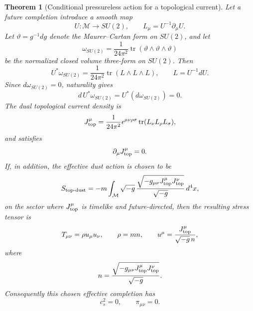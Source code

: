 \documentclass[11pt,a4paper]{article}
\def\dd{d}%
\numberwithin{equation}{section}
\newtheorem{theorem}[criterion]{Theorem}
\theoremstyle{remark}
\newcommand{\M}{\mathcal{M}}
\newcommand{\dd}{\mathrm{d}}
\begin{document}
\begin{theorem}[Conditional pressureless action for a topological current]
Let a future completion introduce a smooth map
\begin{equation}
U:\M\longrightarrow SU(2),
\qquad
L_\mu=U^{-1}\partial_\mu U.
\end{equation}
Let \(\vartheta=g^{-1}\dd g\) denote the Maurer--Cartan form on \(SU(2)\), and let
\begin{equation}
\omega_{SU(2)}
=
\frac{1}{24\pi^2}
\operatorname{tr}(\vartheta\wedge\vartheta\wedge\vartheta)
\end{equation}
be the normalized closed volume three-form on \(SU(2)\). Then
\begin{equation}
U^*\omega_{SU(2)}
=
\frac{1}{24\pi^2}
\operatorname{tr}(L\wedge L\wedge L),
\qquad
L=U^{-1}\dd U.
\end{equation}
Since \(\dd\omega_{SU(2)}=0\), naturality gives
\begin{equation}
\dd\,U^*\omega_{SU(2)}=U^*(\dd\omega_{SU(2)})=0.
\end{equation}
The dual topological current density is
\begin{equation}
J^\mu_{\rm top}
=
\frac{1}{24\pi^2}
\epsilon^{\mu\nu\rho\sigma}
\operatorname{tr}(L_\nu L_\rho L_\sigma),
\end{equation}
and satisfies
\begin{equation}
\partial_\mu J^\mu_{\rm top}=0.
\end{equation}
If, in addition, the effective dust action is chosen to be
\begin{equation}
S_{\rm top\text{-}dust}
=-m\int_{\M}\sqrt{-g}\,
\frac{\sqrt{-g_{\mu\nu}J^\mu_{\rm top}J^\nu_{\rm top}}}{\sqrt{-g}}\,
\dd^4x,
\end{equation}
on the sector where \(J^\mu_{\rm top}\) is timelike and future-directed, then the resulting stress tensor is
\begin{equation}
T_{\mu\nu}=\rho u_\mu u_\nu,
\qquad
\rho=mn,
\qquad
u^\mu=\frac{J^\mu_{\rm top}}{\sqrt{-g}\,n},
\end{equation}
where
\begin{equation}
n=\frac{\sqrt{-g_{\mu\nu}J^\mu_{\rm top}J^\nu_{\rm top}}}{\sqrt{-g}}.
\end{equation}
Consequently this chosen effective completion has
\begin{equation}
c_s^2=0,
\qquad
\pi_{\mu\nu}=0.
\end{equation}
\end{theorem}
\end{document}
